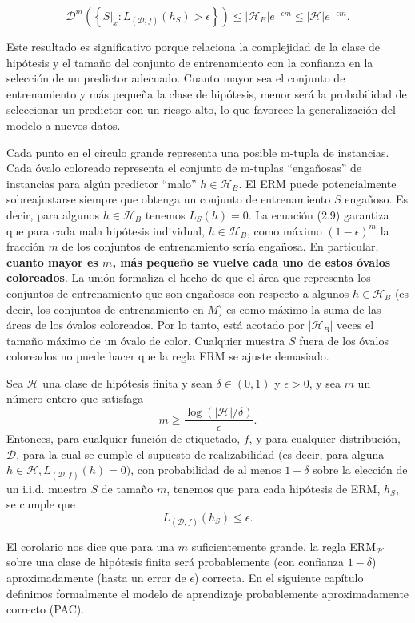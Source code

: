$$\mathcal{D}^m\left(\left\{S|_x : L_{(\mathcal{D},f)}(h_S) > \epsilon\right\}\right) \leq |\mathcal{H}_B|e^{-\epsilon m} \leq |\mathcal{H}| e^{-\epsilon m}.
$$

Este resultado es significativo porque relaciona la complejidad de la clase de hipótesis y el tamaño del conjunto de entrenamiento con la confianza en la selección de un predictor adecuado. Cuanto mayor sea el conjunto de entrenamiento y más pequeña la clase de hipótesis, menor será la probabilidad de seleccionar un predictor con un riesgo alto, lo que favorece la generalización del modelo a nuevos datos.

Cada punto en el círculo grande representa una posible m-tupla de instancias. Cada óvalo coloreado representa el conjunto de m-tuplas “engañosas” de instancias para algún predictor “malo” $h \in \mathcal{H}_B$. El ERM puede potencialmente sobreajustarse siempre que obtenga un conjunto de entrenamiento $S$ engañoso. Es decir, para algunos $h \in \mathcal{H}_B$ tenemos $L_S(h) = 0$. La ecuación (2.9) garantiza que para cada mala hipótesis individual, $h \in \mathcal{H}_B$, como máximo $( 1 - \epsilon)^m$ la fracción $m$ de los conjuntos de entrenamiento sería engañosa. En particular, \textbf{cuanto mayor es \boldmath$m$, más pequeño se vuelve cada uno de estos óvalos coloreados}. La unión formaliza el hecho de que el área que representa los conjuntos de entrenamiento que son engañosos con respecto a algunos $h \in \mathcal{H}_B$ (es decir, los conjuntos de entrenamiento en $M$) es como máximo la suma de las áreas de los óvalos coloreados. Por lo tanto, está acotado por $|\mathcal{H}_B|$ veces el tamaño máximo de un óvalo de color. Cualquier muestra $S$ fuera de los óvalos coloreados no puede hacer que la regla ERM se ajuste demasiado.

\begin{cor} Sea $\mathcal{H}$ una clase de hipótesis finita y sean $\delta \in (0,1)$ y $\epsilon>0$, y sea $m$ un número entero que satisfaga
    $$m\geq \dfrac{\log(|\mathcal{H}|/\delta)}{\epsilon}.$$
    Entonces, para cualquier función de etiquetado, $f$, y para cualquier distribución, $\mathcal{D}$, para la cual se cumple el supuesto de realizabilidad (es decir, para alguna $h \in \mathcal{H}, L_{(\mathcal{D},f)}(h) = 0)$, con probabilidad de al menos $1 - \delta$ sobre la elección de un i.i.d. muestra $S$ de tamaño $m$, tenemos que para cada hipótesis de ERM, $h_S$, se cumple que
    $$L_{(\mathcal{D},f)}(h_S) \leq \epsilon.$$
\end{cor}
El corolario nos dice que para una $m$ suficientemente grande, la regla ERM$_\mathcal{H}$ sobre una clase de hipótesis finita será probablemente (con confianza $1-\delta$) aproximadamente (hasta un error de $\epsilon$) correcta. En el siguiente capítulo definimos formalmente el modelo de aprendizaje probablemente aproximadamente correcto (PAC).

